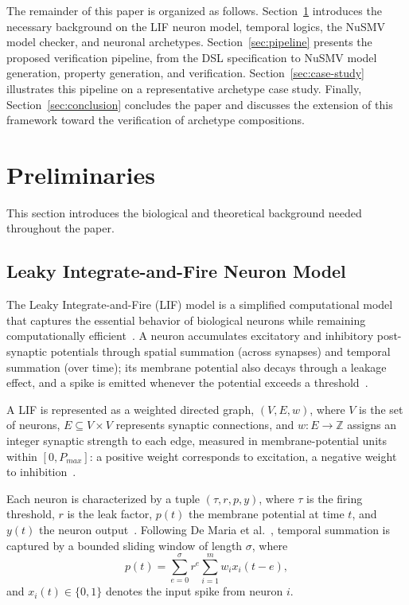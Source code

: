 \documentclass[
]{ceurart}
\begin{document}
The remainder of this paper is organized as follows. Section~\ref{sec:preliminaries}
introduces the necessary background on the LIF neuron model, temporal logics,
the NuSMV model checker, and neuronal archetypes. Section~\ref{sec:pipeline}
presents the proposed verification pipeline, from the DSL specification to
NuSMV model generation, property generation, and verification.
Section~\ref{sec:case-study} illustrates this pipeline on a representative
archetype case study. Finally, Section~\ref{sec:conclusion} concludes the
paper and discusses the extension of this framework toward the verification
of archetype compositions.

\section{Preliminaries}
\label{sec:preliminaries}

This section introduces the biological and theoretical background needed throughout the paper.

\subsection{Leaky Integrate-and-Fire Neuron Model}
\label{sec:lif}

The Leaky Integrate-and-Fire (LIF) model is a simplified computational model
that captures the essential behavior of biological neurons while remaining
computationally efficient~\cite{Lapicque1907,Gerstner2002}. A neuron
accumulates excitatory and inhibitory post-synaptic potentials through
spatial summation (across synapses) and temporal summation (over time); its
membrane potential also decays through a leakage effect, and a spike is
emitted whenever the potential exceeds a threshold~\cite{DeMaria2020,Gerstner2002,Purves2006}.

A LIF is represented as a weighted directed graph,
$(V, E, w)$, where $V$ is the set of neurons, $E \subseteq V \times V$
represents synaptic connections, and $w : E \to \mathbb{Z}$ assigns an
integer synaptic strength to each edge, measured in membrane-potential units
within $[0, P_{max}]$: a positive weight corresponds to excitation, a
negative weight to inhibition~\cite{DeMaria2020}.

Each neuron is characterized by a tuple $(\tau, r, p, y)$, where $\tau$ is the
firing threshold, $r$ is the leak factor, $p(t)$ the membrane potential
at time $t$, and $y(t)$ the neuron output~\cite{Lapicque1907,DeMaria2020}.
Following De Maria et al.~\cite{DeMaria2020}, temporal summation is captured
by a bounded sliding window of length $\sigma$, where
\[
p(t)=\sum_{e=0}^{\sigma} r^{e}\sum_{i=1}^{m} w_i x_i(t-e),
\]
and $x_i(t)\in\{0,1\}$ denotes the input spike from neuron $i$.
\end{document}
